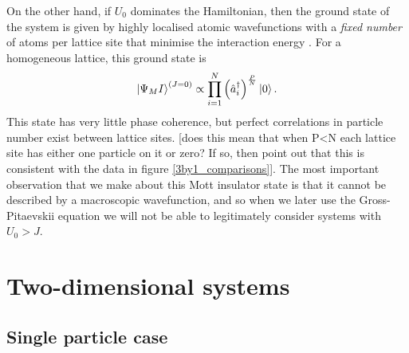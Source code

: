 \documentclass[a4paper, 10pt]{article}
\theoremstyle{plain}
\begin{document}
On the other hand, if $U_{0}$ dominates the Hamiltonian, then the
ground state of the system is given by highly localised atomic wavefunctions
with a \emph{fixed number} of atoms per lattice site that minimise the
interaction energy \cite{Bloch2005}. For a homogeneous lattice, this ground
state is
\begin{equation}
    \ket{\Psi_MI}^{\left(J=0\right)}
    \propto
    \prod_{i=1}^N \left( \hat{a}_i^\dagger \right)^\frac{P}{N}
    \ket{0}.
\end{equation}
This state has very little phase coherence, but perfect correlations in particle
number exist between lattice sites. [does this mean
that when P<N each lattice site has either one particle on it or zero? If so,
then point out that this is consistent with the data in figure
\ref{3by1_comparisons}]. The most important observation that we make about this
Mott insulator state is that it cannot be described by a macroscopic
wavefunction, and so when we later use the Gross-Pitaevskii equation we will
not be able to legitimately consider systems with $U_{0}>J$.


\section{Two-dimensional systems\label{2Dsystems}}

\subsection{Single particle case\label{2DNoninteractingsection}}
\end{document}
